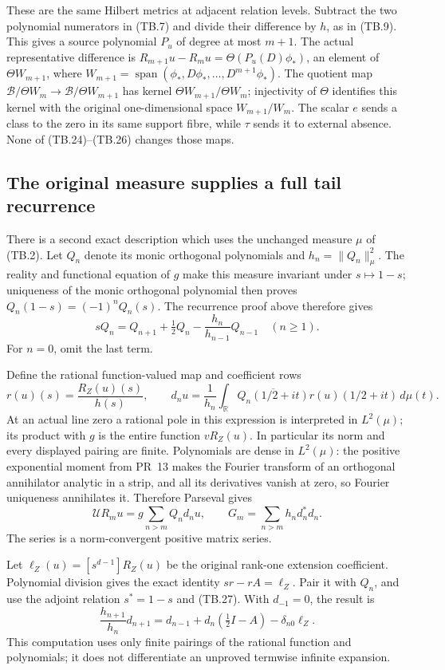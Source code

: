 These are the same Hilbert metrics at adjacent relation levels.
Subtract the two polynomial numerators in (TB.7) and divide
their difference by \(h\), as in (TB.9).  This gives a source
polynomial \(P_u\) of degree at most \(m+1\).
The actual representative difference is
\(R_{m+1}u-R_mu=\Theta(P_u(D)\phi_*)\), an element
of \(\Theta W_{m+1}\), where
\(W_{m+1}=\operatorname{span}(\phi_*,D\phi_*,\ldots,D^{m+1}\phi_*)\).
The quotient map
\(\mathscr B/\Theta W_m\to\mathscr B/\Theta W_{m+1}\)
has kernel \(\Theta W_{m+1}/\Theta W_m\);
injectivity of \(\Theta\) identifies this kernel with the original
one-dimensional space \(W_{m+1}/W_m\).
The scalar \(e\) sends a class to the zero in its same support
fibre, while \(\tau\) sends it to external absence.  None of
(TB.24)--(TB.26) changes those maps.

\subsection{The original measure supplies a full tail recurrence}

There is a second exact description which uses the unchanged
measure \(\mu\) of (TB.2).  Let \(Q_n\) denote its monic orthogonal
polynomials and \(h_n=\|Q_n\|_\mu^2\).
The reality and functional equation of \(g\) make this measure
invariant under \(s\mapsto1-s\); uniqueness of the monic
orthogonal polynomial then proves
\(Q_n(1-s)=(-1)^nQ_n(s)\).
The recurrence proof above therefore gives
\[
 sQ_n=Q_{n+1}+\tfrac12Q_n-\frac{h_n}{h_{n-1}}Q_{n-1}
 \quad(n\geq1).
 \tag{TB.27}
\]
For \(n=0\), omit the last term.

Define the rational function-valued map and coefficient rows
\[
 r(u)(s)=\frac{R_Z(u)(s)}{h(s)},\qquad
 d_nu=\frac1{h_n}\int_{\mathbb R}
       \overline{Q_n(1/2+it)}r(u)(1/2+it)\,d\mu(t).
 \tag{TB.28}
\]
At an actual line zero a rational pole in this expression is
interpreted in \(L^2(\mu)\); its product with \(g\) is the entire
function \(vR_Z(u)\).  In particular its norm and every displayed
pairing are finite.  Polynomials are dense in \(L^2(\mu)\):
the positive exponential moment from PR~13 makes the Fourier
transform of an orthogonal annihilator analytic in a strip,
and all its derivatives vanish at zero, so Fourier uniqueness
annihilates it.  Therefore Parseval gives
\[
 \mathcal UR_mu=g\sum_{n>m}Q_nd_nu,\qquad
 \boxed{G_m=\sum_{n>m}h_nd_n^*d_n.}
 \tag{TB.29}
\]
The series is a norm-convergent positive matrix series.

Let \(\ell_Z(u)=[s^{d-1}]R_Z(u)\) be the original rank-one
extension coefficient.  Polynomial division gives the exact
identity \(sr-rA=\ell_Z\).  Pair it with \(Q_n\), and use
the adjoint relation \(s^*=1-s\) and (TB.27).  With \(d_{-1}=0\),
the result is
\[
 \boxed{\frac{h_{n+1}}{h_n}d_{n+1}
 =d_{n-1}+d_n(\tfrac12 I-A)-\delta_{n0}\ell_Z.}
 \tag{TB.30}
\]
This computation uses only finite pairings of the rational
function and polynomials; it does not differentiate an
unproved termwise infinite expansion.

